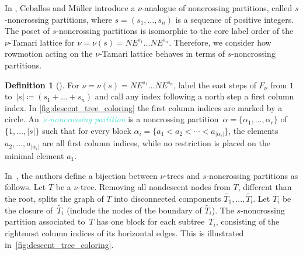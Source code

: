 \documentclass[11pt]{amsart}
\newcommand{\dfn}[1]{\textcolor{Turquoise}{\emph{#1}}}
\theoremstyle{definition}
\newtheorem{definition}[theorem]{Definition}
\begin{document}
In \cite{ceballos2026snoncrossing}, Ceballos and M\"uller introduce a $\nu$-analogue of noncrossing partitions, called $s$-noncrossing partitions, where $s=(s_1,\dots,s_n)$ is a sequence of positive integers. The poset of $s$-noncrossing partitions is isomorphic to the core label order of the $\nu$-Tamari lattice for $\nu=\nu(s)=NE^{s_1} \dots NE^{s_n}$. Therefore, we consider how rowmotion acting on the $\nu$-Tamari lattice behaves in terms of $s$-noncrossing partitions. 

\begin{definition}[\cite{ceballos2026snoncrossing}]
For $\nu=\nu(s)=NE^{s_1} \dots NE^{s_n}$, label the east steps of $F_\nu$ from $1$ to~$|s| \coloneqq (s_1+\dots + s_n)$ and call any index following a north step a first column index. In \cref{fig:descent_tree_coloring} the first column indices are marked by a circle. An~\dfn{$s$-noncrossing partition} is a noncrossing partition~$\alpha = \{\alpha_1, \dots, \alpha_r\}$ of $\{1,\dots,|s|\}$ such that for every block $\alpha_i = \{a_1 < a_2 < \cdots < a_{|\alpha_i|}\}$, the elements $a_2, \dots, a_{|\alpha_i|}$ are all first column indices, while no restriction is placed on the minimal element $a_1$.
\end{definition}

In~\cite{ceballos2026snoncrossing}, the authors define a bijection between $\nu$-trees and $s$-noncrossing partitions as follows. Let $T$ be a $\nu$-tree. Removing all nondescent nodes from $T$, different than the root, splits the graph of $T$ into disconnected components $\widetilde{T_1},...,\widetilde{T_l}$. Let $T_i$ be the closure of~$\widetilde{T_i}$ (include the nodes of the boundary of $\widetilde{T_i}$). The $s$-noncrossing partition associated to~$T$ has one block for each subtree~$T_i$, consisting of the rightmost column indices of its horizontal edges. This is illustrated in~\cref{fig:descent_tree_coloring}.
\end{document}
